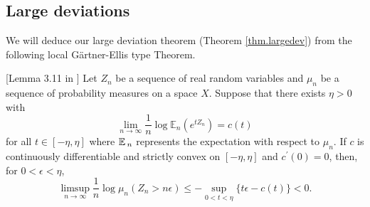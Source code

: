 \documentclass[12pt,a4paper,reqno]{amsart}
\begin{document}
\subsection{Large deviations}\label{subsec:LD}

We will deduce our large deviation theorem  (Theorem \ref{thm.largedev})   from   the following local G\"artner-Ellis type Theorem.
\begin{lemma}\label{lem.localldp} [Lemma 3.11 in \cite{CanPol2}]
Let $Z_n$ be a sequence of real random variables and $\mu_n$ be a sequence of probability measures on a space $X$.  Suppose that
there exists $\eta>0$ with
\[
\lim_{n\to\infty} \frac{1}{n}\log \mathbb{E}_n(e^{tZ_n}) = c(t)
\]
for all $t \in [-\eta, \eta]$ where ${\mathbb E}\,_n$ represents the expectation with respect to $\mu_n$.
If $c$ is continuously differentiable and strictly convex on $[-\eta,\eta]$ and $c^\prime(0)=0$, then, for $0<\epsilon< \eta$,
\[
\limsup_{n\to\infty} \frac{1}{n}\log \mu_n(Z_n>n\epsilon) \le -\sup_{0<t<\eta} \{t\epsilon - c(t)\} <0.
\]

\end{lemma}

\end{document}
